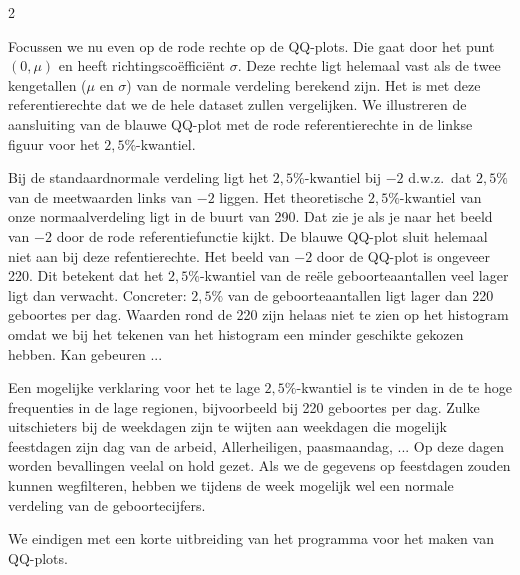 \begin{multicols}{2}

Focussen we nu even op de rode rechte op de QQ-plots. Die gaat door het punt $(0,\mu)$ en heeft richtingscoëfficiënt $\sigma$. Deze rechte ligt helemaal vast als de twee kengetallen ($\mu$ en $\sigma$) van de normale verdeling berekend zijn. Het is met deze referentierechte dat we de hele dataset zullen vergelijken. We illustreren de aansluiting van de blauwe QQ-plot met de rode referentierechte in de linkse figuur voor het $2,5\%$-kwantiel. 

Bij de standaardnormale verdeling ligt het $2,5\%$-kwantiel bij $-2$ d.w.z.\ dat $2,5\%$ van de meetwaarden links van $-2$ liggen. Het theoretische $2,5\%$-kwantiel van onze normaalverdeling ligt in de buurt van 290. Dat zie je als je naar het beeld van $-2$ door de rode referentiefunctie kijkt. De blauwe QQ-plot sluit helemaal niet aan bij deze refentierechte. Het beeld van $-2$ door de QQ-plot is ongeveer 220. Dit betekent dat het $2,5\%$-kwantiel van de reële geboorteaantallen veel lager ligt dan verwacht. Concreter: $2,5\%$ van de geboorteaantallen ligt lager dan 220 geboortes per dag. Waarden rond de 220 zijn helaas niet te zien op het histogram omdat we bij het tekenen van het histogram een minder geschikte  gekozen hebben. Kan gebeuren ...

Een mogelijke verklaring voor het te lage $2,5\%$-kwantiel is te vinden in de te hoge frequenties in de lage regionen, bijvoorbeeld bij 220 geboortes per dag. Zulke uitschieters bij de weekdagen zijn te wijten aan weekdagen die mogelijk feestdagen zijn dag van de arbeid, Allerheiligen, paasmaandag, ... Op deze dagen worden bevallingen veelal on hold gezet. Als we de gegevens op feestdagen zouden kunnen wegfilteren, hebben we tijdens de week mogelijk wel een normale verdeling van de geboortecijfers.

We eindigen met een korte uitbreiding van het programma voor het maken van QQ-plots.

\end{multicols}





